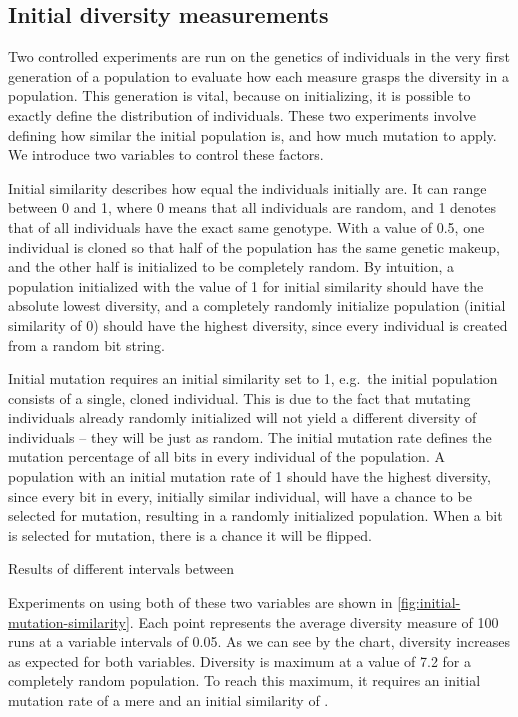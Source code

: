 \subsection{Initial diversity measurements}
Two controlled experiments are run on the genetics of individuals in the very first generation of a population to evaluate how each measure grasps the diversity in a population. This generation is vital, because on initializing, it is possible to exactly define the distribution of individuals. These two experiments involve defining how similar the initial population is, and how much mutation to apply. We introduce two variables to control these factors.

Initial similarity describes how equal the individuals initially are. It can range between \num{0} and \num{1}, where \num{0} means that all individuals are random, and \num{1} denotes that  of all individuals have the exact same genotype. With a value of \num{0.5}, one individual is cloned so that half of the population has the same genetic makeup, and the other half is initialized to be completely random. By intuition, a population initialized with the value of \num{1} for initial similarity should have the absolute lowest diversity, and a completely randomly initialize population (initial similarity of \num{0}) should have the highest diversity, since every individual is created from a random bit string.

Initial mutation requires an initial similarity set to \num{1}, e.g.\ the initial population consists of a single, cloned individual. This is due to the fact that mutating individuals already randomly initialized will not yield a different diversity of individuals -- they will be just as random. The initial mutation rate defines the mutation percentage of all bits in every individual of the population. A population with an initial mutation rate of \num{1} should have the highest diversity, since every bit in every, initially similar individual, will have a  chance to be selected for mutation, resulting in a randomly initialized population. When a bit is selected for mutation, there is a  chance it will be flipped.

Results of different intervals between 

Experiments on \dia{} using both of these two variables are shown in \cref{fig:initial-mutation-similarity}. Each point represents the average diversity measure of \num{100} runs at a variable intervals of \num{0.05}. As we can see by the chart, diversity increases as expected for both variables. Diversity is maximum at a value of \num{7.2} for a completely random population. To reach this maximum, it requires an initial mutation rate of a mere  and an initial similarity of .



